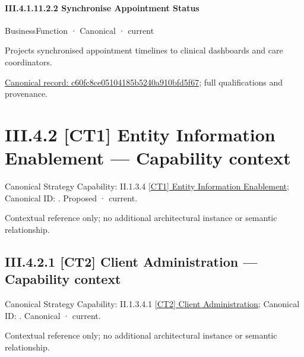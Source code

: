 \paragraph*{III.4.1.11.2.2 Synchronise Appointment Status}
\label{navigation:III.4.1.11.2.2}

\label{element:c60fc8ce05104185b5240a910bfd5f67}
{\small BusinessFunction · Canonical · current}\par

Projects synchronised appointment timelines to clinical dashboards and care coordinators.


{\footnotesize \href{../../../../../../../continuum/business/business-function/c60fc8ce05104185b5240a910bfd5f67.md}{Canonical record: c60fc8ce05104185b5240a910bfd5f67}; full qualifications and provenance.}\par
\section*{III.4.2 [CT1] Entity Information Enablement — Capability context}
\label{navigation:III.4.2}

{\small Canonical Strategy Capability: II.1.3.4 \hyperref[element:b5a92874f8ac4509a30af5253590edc1]{[CT1] Entity Information Enablement}; Canonical ID: \texttt{}. Proposed · current.}\par
Contextual reference only; no additional architectural instance or semantic relationship.\par
\subsection*{III.4.2.1 [CT2] Client Administration — Capability context}
\label{navigation:III.4.2.1}

{\small Canonical Strategy Capability: II.1.3.4.1 \hyperref[element:f0885472cced4bccbcce1568bf0360dc]{[CT2] Client Administration}; Canonical ID: \texttt{}. Canonical · current.}\par
Contextual reference only; no additional architectural instance or semantic relationship.\par
